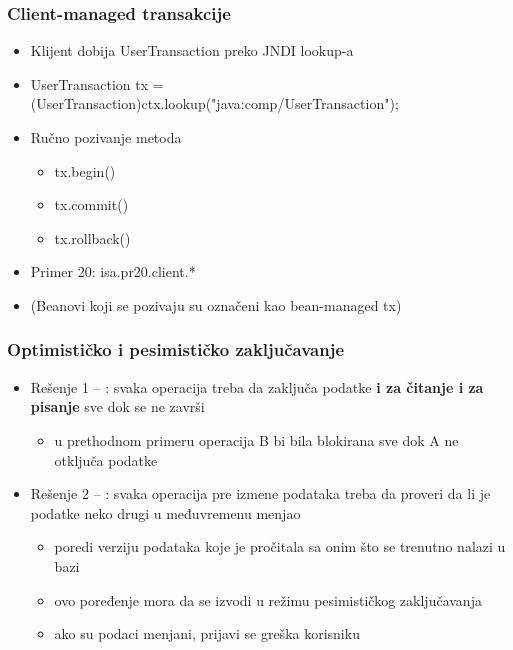 \documentclass[compress]{beamer}
\begin{document}
\begin{frame}
  \frametitle{Client-managed transakcije}
  \begin{itemize}
    \item Klijent dobija UserTransaction preko JNDI lookup-a
    \item UserTransaction tx = (UserTransaction)ctx.lookup("java:comp/UserTransaction");
    \item Ručno pozivanje metoda
    \begin{itemize}
      \item tx.begin()
      \item tx.commit()
      \item tx.rollback()
    \end{itemize}
    \item Primer 20: isa.pr20.client.*
    \item (Beanovi koji se pozivaju su označeni kao bean-managed tx)
  \end{itemize}
\end{frame}
\begin{frame}
  \frametitle{Optimističko i pesimističko zaključavanje}
  \begin{itemize}
    \item Rešenje 1 -- : svaka operacija treba da zaključa podatke \textbf{i za čitanje i za pisanje} sve dok se ne završi
    \begin{itemize}
      \item u prethodnom primeru operacija B bi bila blokirana sve dok A ne otključa podatke
    \end{itemize}
    \item Rešenje 2 -- : svaka operacija pre izmene podataka treba da proveri da li je podatke neko drugi u međuvremenu menjao
    \begin{itemize}
      \item poredi verziju podataka koje je pročitala sa onim što se trenutno nalazi u bazi
      \item ovo poređenje mora da se izvodi u režimu pesimističkog zaključavanja
      \item ako su podaci menjani, prijavi se greška korisniku
    \end{itemize}
  \end{itemize}
\end{frame}
\end{document}
